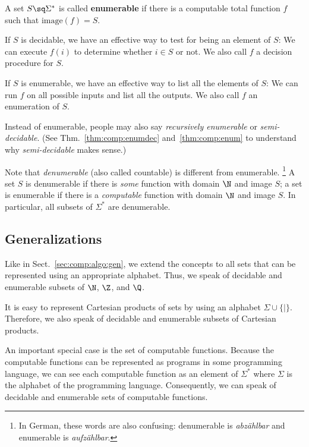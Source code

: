 \begin{definition}\label{def:comp:enum}
A set $S\sq\Sigma^*$ is called \textbf{enumerable} if there is a computable total function $f$ such that $\mathrm{image}(f)=S$.
\end{definition}

If $S$ is decidable, we have an effective way to test for being an element of $S$: We can execute $f(i)$ to determine whether $i\in S$ or not.
We also call $f$ a decision procedure for $S$.

If $S$ is enumerable, we have an effective way to list all the elements of $S$: We can run $f$ on all possible inputs and list all the outputs.
We also call $f$ an enumeration of $S$.

\begin{terminology}
Instead of enumerable, people may also say \emph{recursively enumerable} or \emph{semi-decidable}.
(See Thm.~\ref{thm:comp:enumdec} and~\ref{thm:comp:enum} to understand why \emph{semi-decidable} makes sense.)

Note that \emph{denumerable} (also called countable) is different from enumerable.%
\footnote{In German, these words are also confusing: denumerable is \emph{abz\"ahlbar} and enumerable is \emph{aufz\"ahlbar}.}
A set $S$ is denumerable if there is \emph{some} function with domain $\N$ and image $S$; a set is enumerable if there is a \emph{computable} function with domain $\N$ and image $S$.
In particular, all subsets of $\Sigma^*$ are denumerable.
\end{terminology}

\subsection{Generalizations}\label{sec:comp:data:gen}

Like in Sect.~\ref{sec:comp:algo:gen}, we extend the concepts to all sets that can be represented using an appropriate alphabet.
Thus, we speak of decidable and enumerable subsets of $\N$, $\Z$, and $\Q$.

It is easy to represent Cartesian products of sets by using an alphabet $\Sigma\cup\{|\}$.
Therefore, we also speak of decidable and enumerable subsets of Cartesian products.

An important special case is the set of computable functions.
Because the computable functions can be represented as programs in some programming language, we can see each computable function as an element of $\Sigma^*$ where $\Sigma$ is the alphabet of the programming language.
Consequently, we can speak of decidable and enumerable sets of computable functions.

